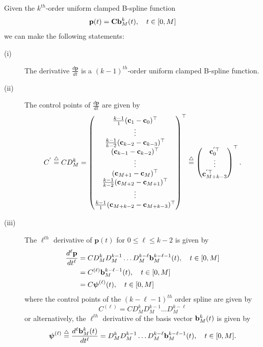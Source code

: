 \begin{corollary} \label{cor:derivatives_clamped_splines}
	Given the $k^{th}$-order uniform clamped B-spline function
	\[
	\mathbf{p}(t) = \mathbf{C} \mathbf{b}_M^k(t), \quad t\in[0, M]
	\]
	we can make the following statements:
	\begin{description}
	\item[(i)] The derivative  $\frac{d\mathbf{p}}{dt}$ is a $(k-1)^{th}$-order uniform clamped B-spline function.
	\item[(ii)] The control points of $\frac{d\mathbf{p}}{dt}$ are given by
		\[
		C^{'} \stackrel{\triangle}{=} C D_M^k = \begin{pmatrix}
				\frac{k-1}{1} (\mathbf{c}_1 - \mathbf{c}_0)^\top \\
				\vdots \\
				\frac{k-1}{k-2} (\mathbf{c}_{k-2} - \mathbf{c}_{k-3})^\top \\
				(\mathbf{c}_{k-1} - \mathbf{c}_{k-2})^\top \\
				\vdots \\
				(\mathbf{c}_{M+1} - \mathbf{c}_{M})^\top \\
				\frac{k-1}{k-2} (\mathbf{c}_{M+2}-\mathbf{c}_{M+1})^\top \\
				\vdots \\
				\frac{k-1}{1} (\mathbf{c}_{M+k-2} - \mathbf{c}_{M+k-3})^\top
 				\end{pmatrix}^\top
 			\stackrel{\triangle}{=} \begin{pmatrix}
 			        \mathbf{c}_0^{'\top} \\
 			        \vdots \\
 			        \mathbf{c}_{M+k-3}^{'\top}
 				   \end{pmatrix}^\top.
		\]
	\item[(iii)] The $\ell^{th}$ derivative of $\mathbf{p}(t)$ for $0\leq\ell\leq k-2$ is given by
		\begin{align*}
			\frac{d^{\ell}\mathbf{p}}{dt^{\ell}} 
			&= C D_M^k D_M^{k-1} \dots D_M^{k-\ell} \mathbf{b}_M^{k-\ell-1}(t), \quad t\in [0, M] \\
			&= C^{(\ell)} \mathbf{b}_M^{k-\ell-1}(t), \quad t\in [0, M] \\
			&= C \boldsymbol{\psi}^{(\ell)}(t), \quad t\in [0, M] \\
		\end{align*}
		where the control points of the $(k-\ell-1)^{th}$ order spline are given by
		\[
			C^{(\ell)} = C D_M^k D_M^{k-1} \dots D_M^{k-\ell}
		\]
		or alternatively, the $\ell^{th}$ derivative of the basis vector $\mathbf{b}_M^k(t)$ is given by
		\[
			\boldsymbol{\psi}^{(\ell)} \stackrel{\triangle}{=} \frac{d^{\ell}\mathbf{b}_M^k(t)}{dt^{\ell}} = D_M^k D_M^{k-1} \dots D_M^{k-\ell} \mathbf{b}_M^{k-\ell-1}(t), \quad t\in [0, M].
\]
\end{description}
\end{corollary}
